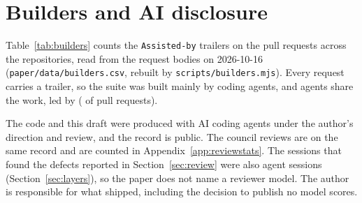 \section{Builders and AI disclosure}
\label{app:builders}

Table~\ref{tab:builders} counts the \texttt{Assisted-by} trailers on the \buildersPrs{} pull requests across the \suitePackages{} repositories, read from the request bodies on 2026-10-16 (\texttt{paper/data/builders.csv}, rebuilt by \texttt{scripts/builders.mjs}). Every request carries a trailer, so the suite was built mainly by coding agents, and \builderAgents{} agents share the work, led by \builderTopAgent{} (\builderTopAgentPrs{} of \buildersPrs{} pull requests).

The code and this draft were produced with AI coding agents under the author's direction and review, and the record is public. The council reviews are on the same record and are counted in Appendix~\ref{app:reviewstats}. The sessions that found the defects reported in Section~\ref{sec:review} were also agent sessions (Section~\ref{sec:layers}), so the paper does not name a reviewer model. The author is responsible for what shipped, including the decision to publish no model scores.
